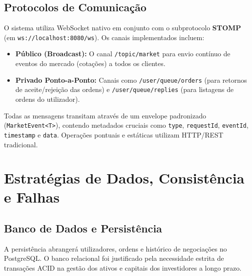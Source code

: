 \documentclass[12pt,a4paper]{article}
\begin{document}
\subsection{Protocolos de Comunicação}
O sistema utiliza WebSocket nativo em conjunto com o subprotocolo \textbf{STOMP} (em \texttt{ws://localhost:8080/ws}). Os canais implementados incluem:
\begin{itemize}
    \item \textbf{Público (Broadcast):} O canal \texttt{/topic/market} para envio contínuo de eventos do mercado (cotações) a todos os clientes.
    \item \textbf{Privado Ponto-a-Ponto:} Canais como \texttt{/user/queue/orders} (para retornos de aceite/rejeição das ordens) e \texttt{/user/queue/replies} (para listagens de ordens do utilizador).
\end{itemize}
Todas as mensagens transitam através de um envelope padronizado (\texttt{MarketEvent<T>}), contendo metadados cruciais como \texttt{type}, \texttt{requestId}, \texttt{eventId}, \texttt{timestamp} e \texttt{data}. Operações pontuais e estáticas utilizam HTTP/REST tradicional.

\section{Estratégias de Dados, Consistência e Falhas}

\subsection{Banco de Dados e Persistência}
A persistência abrangerá utilizadores, ordens e histórico de negociações no PostgreSQL. O banco relacional foi justificado pela necessidade estrita de transações ACID na gestão dos ativos e capitais dos investidores a longo prazo.
\end{document}
